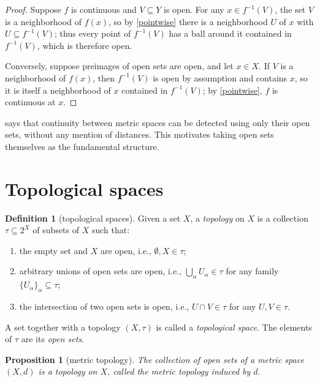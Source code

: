 \documentclass[11pt]{article}
\newtheorem{prop}{Proposition}[section]
\theoremstyle{definition}
\newtheorem{definition}{Definition}[section]
\theoremstyle{remark}
\begin{document}
\begin{proof}
    Suppose $f$ is continuous and $V \subseteq Y$ is open. For any $x \in f^{-1}(V)$, the set $V$ is a neighborhood of $f(x)$, so by \cref{pointwise} there is a neighborhood $U$ of $x$ with $U \subseteq f^{-1}(V)$; thus every point of $f^{-1}(V)$ has a ball around it contained in $f^{-1}(V)$, which is therefore open.

    Conversely, suppose preimages of open sets are open, and let $x \in X$. If $V$ is a neighborhood of $f(x)$, then $f^{-1}(V)$ is open by assumption and contains $x$, so it is itself a neighborhood of $x$ contained in $f^{-1}(V)$; by \cref{pointwise}, $f$ is continuous at $x$.
\end{proof}

 says that continuity between metric spaces can be detected using only their open sets, without any mention of distances. This motivates taking open sets themselves as the fundamental structure.

\section{Topological spaces}

\begin{definition}[topological spaces]
    \label{topspace}
    Given a set $X$, a \emph{topology} on $X$ is a collection $\tau \subseteq 2^X$ of subsets of $X$ such that:
    \begin{enumerate}[(1)]
        \item the empty set and $X$ are open, i.e., $\emptyset, X \in \tau$;
        \item arbitrary unions of open sets are open, i.e., $\bigcup_{\alpha} U_\alpha \in \tau$ for any family $\{U_\alpha\}_\alpha \subseteq \tau$;
        \item the intersection of two open sets is open, i.e., $U \cap V \in \tau$ for any $U, V \in \tau$.
    \end{enumerate}
    A set together with a topology $(X, \tau)$ is called a \emph{topological space}. The elements of $\tau$ are its \emph{open sets}.
\end{definition}

\begin{prop}[metric topology]
    \label{metrictop}
    The collection of open sets of a metric space $(X, d)$ is a topology on $X$, called the \emph{metric topology} induced by $d$.
\end{prop}
\end{document}
